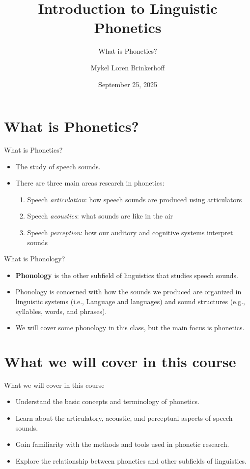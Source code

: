\documentclass[professionalfonts]{beamer}
\title[LING 450/550] %
{Introduction to Linguistic Phonetics}
\subtitle{What is Phonetics?}
\author[Brinkerhoff] %
{Mykel Loren Brinkerhoff}
\institute[UW] %
{University of Washington}
\date[2025-09-25] %
{September 25, 2025}
\begin{document}
\begin{frame}
  \titlepage
\end{frame}

\section{What is Phonetics?}
\begin{frame}{What is Phonetics?}
    \begin{itemize}
        \item The study of speech sounds.
        \item There are three main areas research in phonetics:
        \begin{enumerate}
            \item Speech \textit{articulation}: how speech sounds are produced using articulators
            \item Speech \textit{acoustics}: what sounds are like in the air
            \item Speech \textit{perception}: how our auditory and cognitive systems interpret sounds
        \end{enumerate}
    \end{itemize}
\end{frame}

\begin{frame}{What is Phonology?}
    \begin{itemize}
        \item \textbf{Phonology} is the other subfield of linguistics that studies speech sounds.
        \item Phonology is concerned with how the sounds we produced are organized in linguistic systems (i.e., Language and languages) and sound structures (e.g., syllables, words, and phrases).
        \item We will cover some phonology in this class, but the main focus is phonetics.
    \end{itemize}
\end{frame}

\section{What we will cover in this course}
\begin{frame}{What we will cover in this course}
    \begin{itemize}
        \item Understand the basic concepts and terminology of phonetics.
        \item Learn about the articulatory, acoustic, and perceptual aspects of speech sounds.
        \item Gain familiarity with the methods and tools used in phonetic research.
        \item Explore the relationship between phonetics and other subfields of linguistics.
    \end{itemize}
\end{frame}
\end{document}
